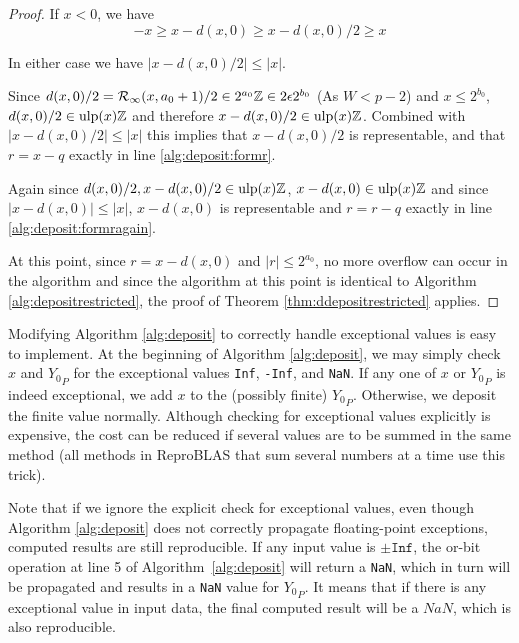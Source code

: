\begin{proof}
         If $x < 0$, we have
        \begin{equation*}
          -x \geq x - d(x, 0) \geq x - d(x, 0)/2 \geq x
        \end{equation*}

        In either case we have $|x - d(x, 0)/2| \leq |x|$.

        Since
        \(
            d(x, 0)/2 = \mathcal{R}_\text{$\infty$}(x, a_0 + 1)/2 \in 2^{a_0}\mathbb{Z} \in 2\epsilon 2^{b_0}
        \)
        (As $W < p - 2$) and $x \leq 2^{b_0}$, $d(x, 0)/2 \in \text{ulp}(x)\mathbb{Z}$ and
        therefore $x - d(x, 0)/2 \in \text{ulp}(x)\mathbb{Z}$. Combined with $|x - d(x, 0)/2| \leq |x|$
        this implies that $x - d(x, 0)/2$ is representable,
        and that $r=x-q$ exactly in line \ref{alg:deposit:formr}.

        Again since $d(x, 0)/2, x - d(x, 0)/2 \in \text{ulp}(x)\mathbb{Z}$, $x - d(x, 0) \in
        \text{ulp}(x)\mathbb{Z}$ and since $|x - d(x, 0)| \leq |x|$, $x - d(x, 0)$ is
        representable and $r=r-q$ exactly in line \ref{alg:deposit:formragain}.

        At this point, since $r = x - d(x, 0)$ and $|r| \leq 2^{a_0}$, no more
        overflow can occur in the algorithm and since the algorithm at this
        point is identical to Algorithm \ref{alg:depositrestricted}, the proof
        of Theorem \ref{thm:ddepositrestricted} applies.
      \end{proof}

      Modifying Algorithm \ref{alg:deposit} to correctly handle exceptional
      values is easy to implement. At the beginning of Algorithm
      \ref{alg:deposit}, we may simply check $x$ and ${Y_0}_P$ for the
      exceptional values \texttt{Inf}, \texttt{-Inf}, and \texttt{NaN}. If any
      one of $x$ or ${Y_0}_P$ is indeed exceptional, we add $x$ to the
      (possibly finite) ${Y_0}_P$. Otherwise, we deposit the finite value
      normally.
      Although checking for exceptional values explicitly is expensive, the
      cost can be reduced if several values are to be summed in the same method
      (all methods in ReproBLAS that sum several numbers at a time use this trick).

      Note that if we ignore the explicit check for exceptional values,
      even though Algorithm \ref{alg:deposit} does not correctly propagate 
      floating-point exceptions, computed results are still reproducible.
      If any input value is $\pm \texttt{Inf}$, the or-bit operation
      at line 5 of Algorithm~\ref{alg:deposit} will return a \texttt{NaN},
      which in turn will be propagated and results in a \texttt{NaN} value for ${Y_0}_P$.
      It means that if there is any exceptional value in input data,
      the final computed result will be a $NaN$, which is also reproducible.

